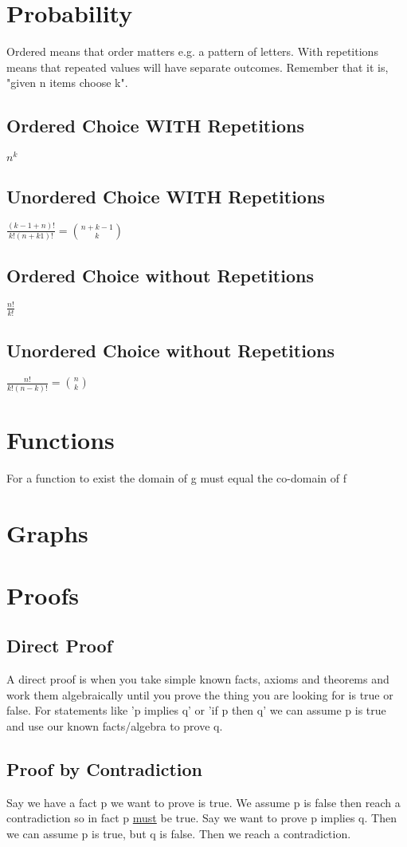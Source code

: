 \documentclass[12pt] {article}
\begin{document}
\section*{Probability}
Ordered means that order matters e.g. a pattern of letters. With repetitions means that repeated values will have 
separate outcomes. Remember that it is, "given n items choose k".
\subsection*{Ordered Choice WITH Repetitions}
$n^k$
\subsection*{Unordered Choice WITH Repetitions}
$\frac{(k-1+n)!}{k!(n+k1)!} = {n + k -1 \choose k}$ 
\subsection*{Ordered Choice without Repetitions}
$\frac{n!}{k!}$
\subsection*{Unordered Choice without Repetitions}
$\frac{n!}{k!(n-k)!} = {n \choose k}$

\section*{Functions}
For a function to exist the domain of g must equal the co-domain of f

\section*{Graphs}

\section*{Proofs}
\subsection*{Direct Proof}
A direct proof is when you take simple known facts, axioms and theorems and 
work them algebraically until you prove the thing you are looking for is true or false.
For statements like 'p implies q' or 'if p then q' we can assume p is true and use 
our known facts/algebra to prove q.
\subsection*{Proof by Contradiction}
Say we have a fact p we want to prove is true. We assume p is false then reach
a contradiction so in fact p \underline{must} be true. Say we want to prove 
p implies q. Then we can assume p is true, but q is false. Then we reach a contradiction.
\end{document}
